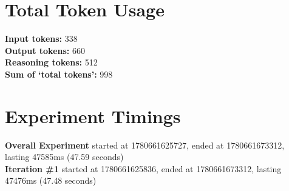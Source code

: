 \documentclass{article}
\begin{document}
\section*{Total Token Usage}
\textbf{Input tokens: }338
\\\textbf{Output tokens: }660
\\\textbf{Reasoning tokens: }512
\\\textbf{Sum of `total tokens': }998
\section*{Experiment Timings}
\textbf{Overall Experiment} started at 1780661625727, ended at 1780661673312, lasting 47585ms (47.59 seconds)
\\\textbf{Iteration \#1} started at 1780661625836, ended at 1780661673312, lasting 47476ms (47.48 seconds)
\end{document}
